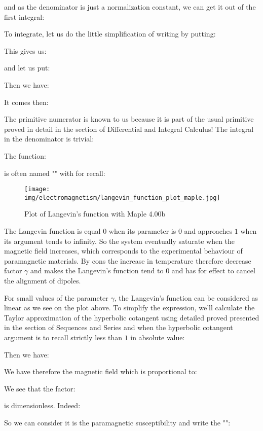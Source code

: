 	and as the denominator is just a normalization constant, we can get it out of the first integral:
	
	To integrate, let us do the little simplification of writing by putting:
	
	This gives us:
	
	and let us put:
	
	Then we have:
	
	It comes then:
	
	The primitive numerator is known to us because it is part of the usual primitive proved in detail in the section of Differential and Integral Calculus! The integral in the denominator is trivial:
	
	The function:
	
	is often named "" with for recall:
	
	\begin{figure}[H]
		\centering
		\texttt{[image: img/electromagnetism/langevin\_function\_plot\_maple.jpg]}
		\caption[]{Plot of Langevin's function with Maple 4.00b}
	\end{figure}
	The Langevin function is equal $0$ when its parameter is $0$ and approaches $1$ when its argument tends to infinity. So the system eventually saturate when the magnetic field increases, which corresponds to the experimental behaviour of paramagnetic materials. By cons the increase in temperature therefore decrease factor $\gamma$ and makes the Langevin's function tend to $0$ and has for effect to cancel the alignment of dipoles.

	For small values of the parameter $\gamma$, the Langevin's function can be considered as linear as we see on the plot above.
	To simplify the expression, we'll calculate the Taylor approximation of the hyperbolic cotangent using detailed proved presented in the section of Sequences and Series and when the hyperbolic cotangent argument is to recall strictly less than $1$ in absolute value:
	
	Then we have:
	
	We have therefore the magnetic field which is proportional to:
	
	We see that the factor:
	
	is dimensionless. Indeed:
	
	So we can consider it is the paramagnetic susceptibility and write the "":
	
